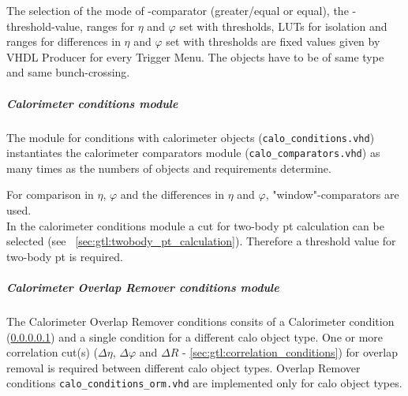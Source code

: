 The selection of the mode of \et-comparator (greater/equal or equal), the \et-threshold-value, ranges for $\eta$ and $\varphi$ set with thresholds, LUTs for isolation and ranges for differences in $\eta$ and $\varphi$ set with thresholds are fixed values given by VHDL Producer for every Trigger Menu.
The objects have to be of same type and same bunch-crossing.

\subparagraph{Calorimeter conditions module}\label{sec:gtl:calo_conditions_module}

The module for conditions with calorimeter objects (\texttt{calo\_conditions.vhd}) instantiates the calorimeter comparators module (\texttt{calo\_comparators.vhd}) as many times as the numbers of objects and requirements determine. 

For comparison in $\eta$, $\varphi$ and the differences in $\eta$ and $\varphi$, "window"-comparators are used.\\
In the calorimeter conditions module a cut for two-body pt calculation can be selected (see ~\ref{sec:gtl:twobody_pt_calculation}). Therefore a threshold value for two-body pt is required.\\

\subparagraph{Calorimeter Overlap Remover conditions module}\label{sec:gtl:calo_conditions_orm_module}
The Calorimeter Overlap Remover conditions consits of a Calorimeter condition (\ref{sec:gtl:calo_conditions_module}) and a single condition for a different calo object type. One or more correlation cut(s) ($\Delta\eta$, $\Delta\varphi$ and $\Delta$$R$ - \ref{sec:gtl:correlation_conditions}) for overlap removal is required between different calo object types.
Overlap Remover conditions \texttt{calo\_conditions\_orm.vhd} are implemented only for calo object types.

